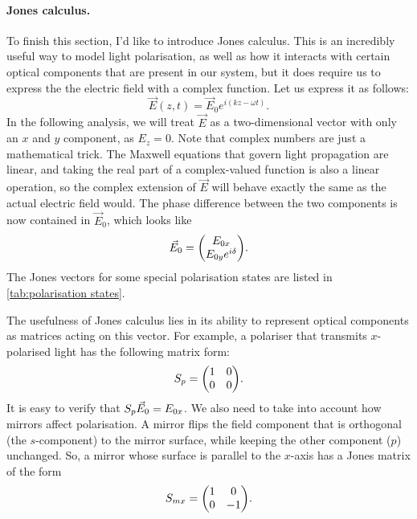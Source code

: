 \paragraph{Jones calculus.} To finish this section, I'd like to introduce Jones calculus. This is an incredibly useful way to model light polarisation, as well as how it interacts with certain optical components that are present in our system, but it does require us to express the the electric field with a complex function. Let us express it as follows:
\begin{equation}
	\vec{E}(z, t) = \vec{E}_0 e^{i(kz-\omega t)}.
	\label{eq:propagator}
\end{equation}
In the following analysis, we will treat $ \vec{E} $ as a two-dimensional vector with only an $ x $ and $ y $ component, as $ E_z = 0 $. Note that complex numbers are just a mathematical trick. The Maxwell equations that govern light propagation are linear, and taking the real part of a complex-valued function is also a linear operation, so the complex extension of $ \vec{E} $ will behave exactly the same as the actual electric field would. The phase difference between the two components is now contained in $ \vec{E}_0 $, which looks like
\begin{equation}
	\vec{E}_0 = \mqty(\Eox \\ \Eoy e^{i\delta} ).
\end{equation}
The Jones vectors for some special polarisation states are listed in \autoref{tab:polarisation states}.

The usefulness of Jones calculus lies in its ability to represent optical components as matrices acting on this vector. For example, a polariser that transmits $ x $-polarised light has the following matrix form:
\begin{equation}
	S_p = \mqty(1 & 0 \\ 0 & 0).
\end{equation}
It is easy to verify that $ S_p \vec{E}_0 = E_{0x} $.  We also need to take into account how mirrors affect polarisation. A mirror flips the field component that is orthogonal (the $ s $-component) to the mirror surface, while keeping the other component ($ p $) unchanged. So, a mirror whose surface is parallel to the $ x $-axis has a Jones matrix of the form
\begin{equation}
	S_{mx} = \mqty(1 & 0 \\ 0 & -1).
\end{equation}

